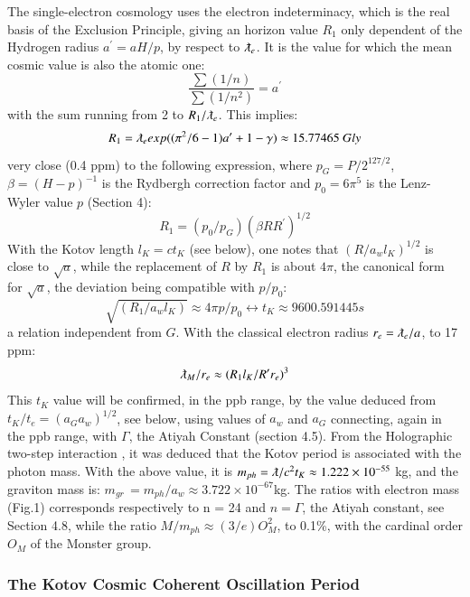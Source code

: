 \documentclass[twoside,draft]{article}
\begin{document}
\begin{sloppypar}
{The single-electron cosmology \cite{Sanchez1} uses the electron indeterminacy, which is the real basis of the
Exclusion Principle, giving an horizon value $R_1$ only dependent of the Hydrogen radius $a^{\prime} = aH/p$, by respect to $\lambdabar_e$. 
It is the value for which the mean cosmic value is also the atomic one:
\begin{equation}
\frac{\sum(1/n)}{\sum(1/n^{2})} = a^{\prime}
\end{equation}
with the sum running from 2 to $R_{1} /\lambdabar_{e}$. This implies:
$$
R_{1} = \lambdabar_{e} exp((\pi^{2} /6 - 1)a^{\prime} + 1 - \gamma) \approx 15.77465 ~ Gly
$$
very close (0.4 ppm) to the following expression, where $p_{G} = P/2^{127/2}$, $\beta = (H - p)^{-1}$ is the
Rydbergh correction factor and $p_{0} = 6\pi^{5}$ is the Lenz-Wyler value $p$ (Section 4):
$$
R_{1} = ( p_{0} /p_{G} )(\beta R R^{\prime})^{1/2}
$$
With the Kotov length $l_{K} = ct_{K}$ (see below), one notes that $(R/a_w l_K)^{1/2} $ is close to $\sqrt{a}$, while
the replacement of $R$ by $R_{1}$ is about $4\pi$, the canonical form for $\sqrt{a}$, the deviation being compatible
with $p/p_{0}$:
$$\sqrt{(R_{1} /a_{w} l_{K})} \approx 4\pi p/p_{0} \leftrightarrow t_{K} \approx 9 600.591445 s$$ a relation independent from $G$. With the classical electron radius $r_e = \lambdabar_e/a$, to 17 ppm:
\begin{equation}
\lambdabar_M / r_{e} \approx (R_1l_K/R^{\prime}r_e)^3
\end{equation} 
This $t_K$ value will be confirmed, in the ppb range, by the value
deduced from $t_{K} /t_{e} = (a_{G} a_{w})^{1/2}$, see below, using values of $a_{w}$ and $a_{G}$ connecting, again in the ppb
range, with $\Gamma$, the Atiyah Constant (section 4.5). 
From the Holographic two-step interaction \cite{Sanchez1}, it was deduced that the Kotov period is
associated with the photon mass. With the above value, it is $m_{ph} = \lambdabar/c^{2} t_{K} \approx 1.222 \times 10^{-55}$ kg, and the graviton mass is: 
$m_{gr}\, = m_{ph} /a_{w} \approx 3.722 \times 10^{-67} $kg.
The ratios with electron mass (Fig.1) corresponds respectively to n = 24 and $n = \Gamma$, the Atiyah constant, see Section 4.8, while the ratio $M/m_{ph} \approx (3/e)O^2_M$, to 0.1\%, with the cardinal order $O_M$ of the Monster group.

\subsubsection{The Kotov Cosmic Coherent Oscillation Period}

}
\end{sloppypar}
\end{document}
